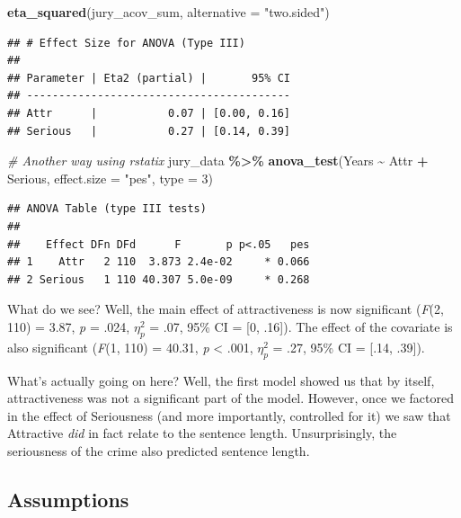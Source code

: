 \documentclass[
]{book}
\newenvironment{Shaded}{\begin{snugshade}}{\end{snugshade}}
\newcommand{\AttributeTok}[1]{\textcolor[rgb]{0.13,0.29,0.53}{#1}}
\newcommand{\CommentTok}[1]{\textcolor[rgb]{0.56,0.35,0.01}{\textit{#1}}}
\newcommand{\DecValTok}[1]{\textcolor[rgb]{0.00,0.00,0.81}{#1}}
\newcommand{\FunctionTok}[1]{\textcolor[rgb]{0.13,0.29,0.53}{\textbf{#1}}}
\newcommand{\NormalTok}[1]{#1}
\newcommand{\SpecialCharTok}[1]{\textcolor[rgb]{0.81,0.36,0.00}{\textbf{#1}}}
\newcommand{\StringTok}[1]{\textcolor[rgb]{0.31,0.60,0.02}{#1}}
\begin{document}
\begin{Shaded}
\begin{Highlighting}[]
\FunctionTok{eta\_squared}\NormalTok{(jury\_acov\_sum, }\AttributeTok{alternative =} \StringTok{"two.sided"}\NormalTok{)}
\end{Highlighting}
\end{Shaded}

\begin{verbatim}
## # Effect Size for ANOVA (Type III)
## 
## Parameter | Eta2 (partial) |       95% CI
## -----------------------------------------
## Attr      |           0.07 | [0.00, 0.16]
## Serious   |           0.27 | [0.14, 0.39]
\end{verbatim}

\begin{Shaded}
\begin{Highlighting}[]
\CommentTok{\# Another way using rstatix}
\NormalTok{jury\_data }\SpecialCharTok{\%\textgreater{}\%}
  \FunctionTok{anova\_test}\NormalTok{(Years }\SpecialCharTok{\textasciitilde{}}\NormalTok{ Attr }\SpecialCharTok{+}\NormalTok{ Serious, }\AttributeTok{effect.size =} \StringTok{"pes"}\NormalTok{, }\AttributeTok{type =} \DecValTok{3}\NormalTok{)}
\end{Highlighting}
\end{Shaded}

\begin{verbatim}
## ANOVA Table (type III tests)
## 
##    Effect DFn DFd      F       p p<.05   pes
## 1    Attr   2 110  3.873 2.4e-02     * 0.066
## 2 Serious   1 110 40.307 5.0e-09     * 0.268
\end{verbatim}

What do we see? Well, the main effect of attractiveness is now significant (\emph{F}(2, 110) = 3.87, \emph{p} = .024, \(\eta^2_p\) = .07, 95\% CI = {[}0, .16{]}). The effect of the covariate is also significant (\emph{F}(1, 110) = 40.31, \emph{p} \textless{} .001, \(\eta^2_p\) = .27, 95\% CI = {[}.14, .39{]}).

What's actually going on here? Well, the first model showed us that by itself, attractiveness was not a significant part of the model. However, once we factored in the effect of Seriousness (and more importantly, controlled for it) we saw that Attractive \emph{did} in fact relate to the sentence length. Unsurprisingly, the seriousness of the crime also predicted sentence length.

\hypertarget{assumptions-2}{%
\subsection{Assumptions}\label{assumptions-2}}
\end{document}
